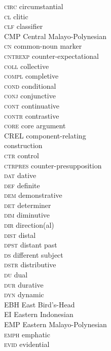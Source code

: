 \begin{multicols}{2}
\begin{tabbing}
 \textsc{circ}  \> circumstantial \\
 \textsc{cl}  \> clitic \\
 \textsc{clf}  \> classifier \\
 \textsc{CMP}  \> Central Malayo-Polynesian \\
 \textsc{cn}  \> common-noun marker \\
 \textsc{cntrexp}  \> counter-expectational \\
 \textsc{coll}  \> collective \\
 \textsc{compl}  \> completive \\
 \textsc{cond}  \> conditional \\
 \textsc{conj}  \> conjunctive \\
 \textsc{cont}  \> continuative \\
 \textsc{contr}  \> contrastive \\
 \textsc{core}  \> core argument \\
 \textsc{CREL}  \> component-relating \\\> construction \\
 \textsc{ctr}  \> control \\
 \textsc{ctrpres}  \> counter-presupposition \\
 \textsc{dat}  \> dative \\
 \textsc{def}  \> definite \\
 \textsc{dem}  \> demonstrative \\
 \textsc{det}  \> determiner \\
 \textsc{dim}  \> diminutive \\
 \textsc{dir}  \> direction(al) \\
 \textsc{dist}  \> distal \\
 \textsc{dpst}  \> distant past \\
 \textsc{ds}  \> different subject \\
 \textsc{dstr}  \> distributive \\
 \textsc{du}  \> dual \\
 \textsc{dur}  \> durative \\
 \textsc{dyn}  \> dynamic \\
 \textsc{EBH}  \> East Bird's-Head \\
 \textsc{EI}  \> Eastern Indonesian \\
 \textsc{EMP}  \> Eastern Malayo-Polynesian \\
 \textsc{emph}  \> emphatic \\
 \textsc{evid}  \> evidential \\

\end{tabbing}
\end{multicols}
